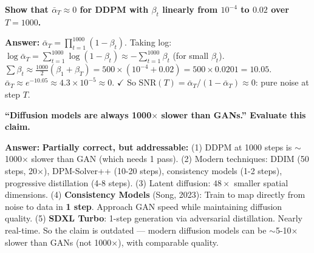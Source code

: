 \begin{examq}
\textbf{Show that $\bar\alpha_T \approx 0$ for DDPM with $\beta_t$ linearly from $10^{-4}$ to $0.02$ over $T = 1000$.}

\textbf{Answer:}
$\bar\alpha_T = \prod_{t=1}^{1000}(1-\beta_t)$. Taking log: $\log\bar\alpha_T = \sum_{t=1}^{1000}\log(1-\beta_t) \approx -\sum_{t=1}^{1000}\beta_t$ (for small $\beta_t$).
$\sum \beta_t \approx \frac{1000}{2}(\beta_1 + \beta_T) = 500 \times (10^{-4} + 0.02) = 500 \times 0.0201 = 10.05$.
$\bar\alpha_T \approx e^{-10.05} \approx 4.3 \times 10^{-5} \approx 0$. $\checkmark$
So $\text{SNR}(T) = \bar\alpha_T / (1-\bar\alpha_T) \approx 0$: pure noise at step $T$.
\end{examq}

\begin{examq}
\textbf{``Diffusion models are always 1000$\times$ slower than GANs.'' Evaluate this claim.}

\textbf{Answer:} \textbf{Partially correct, but addressable:} (1) DDPM at 1000 steps is $\sim$1000$\times$ slower than GAN (which needs 1 pass). (2) Modern techniques: DDIM (50 steps, 20$\times$), DPM-Solver++ (10-20 steps), consistency models (1-2 steps), progressive distillation (4-8 steps). (3) Latent diffusion: $48\times$ smaller spatial dimensions. (4) \textbf{Consistency Models} (Song, 2023): Train to map directly from noise to data in \textbf{1 step}. Approach GAN speed while maintaining diffusion quality. (5) \textbf{SDXL Turbo}: 1-step generation via adversarial distillation. Nearly real-time. So the claim is outdated — modern diffusion models can be $\sim$5-10$\times$ slower than GANs (not 1000$\times$), with comparable quality.
\end{examq}
